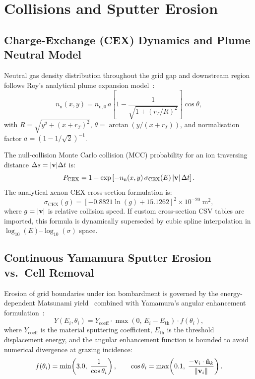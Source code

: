 \documentclass[11pt,a4paper]{article}
\begin{document}
\section{Collisions and Sputter Erosion}

\subsection{Charge-Exchange (CEX) Dynamics and Plume Neutral Model}

Neutral gas density distribution throughout the grid gap and downstream region follows Roy's analytical plume expansion model~\cite{roy}:
\begin{equation}
    n_{\mathrm{n}}(x,y) = n_{\mathrm{n},0} \, a \left[1 - \frac{1}{\sqrt{1 + (r_T / R)^2}}\right] \cos\theta,
\end{equation}
with $R = \sqrt{y^2 + (x + r_T)^2}$, $\theta = \arctan(y / (x + r_T))$, and normalisation factor $a = (1 - 1/\sqrt{2})^{-1}$.

The null-collision Monte Carlo collision (MCC) probability for an ion traversing distance $\Delta s = |\vb{v}|\Delta t$ is:
\begin{equation}
    P_{\mathrm{CEX}} = 1 - \exp\left[-n_{\mathrm{n}}(x,y) \, \sigma_{\mathrm{CEX}}(E) \, |\vb{v}| \, \Delta t\right].
\end{equation}
The analytical xenon CEX cross-section formulation is:
\begin{equation}
    \sigma_{\mathrm{CEX}}(g) = \left[-0.8821\ln(g) + 15.1262\right]^2 \times 10^{-20} \;\si{\meter\squared},
\end{equation}
where $g = |\vb{v}|$ is relative collision speed. If custom cross-section CSV tables are imported, this formula is dynamically superseded by cubic spline interpolation in $\log_{10}(E)$--$\log_{10}(\sigma)$ space.

\subsection{Continuous Yamamura Sputter Erosion vs.\ Cell Removal}

Erosion of grid boundaries under ion bombardment is governed by the energy-dependent Matsunami yield~\cite{matsunami} combined with Yamamura's angular enhancement formulation~\cite{yamamura}:
\begin{equation}
    Y(E_i, \theta_i) = Y_{\mathrm{coeff}} \cdot \max\!\left(0, \, E_i - E_{\mathrm{th}}\right) \cdot f(\theta_i),
\end{equation}
where $Y_{\mathrm{coeff}}$ is the material sputtering coefficient, $E_{\mathrm{th}}$ is the threshold displacement energy, and the angular enhancement function is bounded to avoid numerical divergence at grazing incidence:
\begin{equation}
    f(\theta_i) = \min\!\left(3.0, \; \frac{1}{\cos\theta_i}\right), \qquad \cos\theta_i = \max\!\left(0.1, \; \frac{-\vb{v}_i \cdot \hat{\vb{n}}_k}{\|\vb{v}_i\|}\right).
\end{equation}
\end{document}
